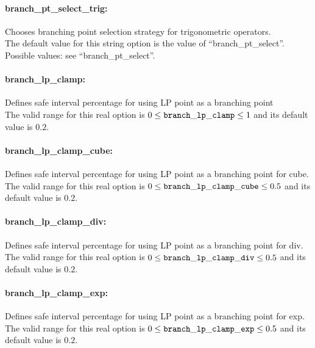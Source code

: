 \paragraph{branch\_pt\_select\_trig:}\label{sec:branch_pt_select_trig} Chooses branching point selection strategy for trigonometric operators. $\;$ \\
The default value for this string option is the value of ``branch\_pt\_select''. \\
Possible values: see ``branch\_pt\_select''.

\paragraph{branch\_lp\_clamp:}\label{sec:branch_lp_clamp} Defines safe interval percentage for using LP point as a branching point $\;$ \\
The valid range for this real option is 
$0 \le {\tt branch\_lp\_clamp } \le 1$
and its default value is $0.2$.

\paragraph{branch\_lp\_clamp\_cube:}\label{sec:branch_lp_clamp_cube} Defines safe interval percentage for using LP point as a branching point for cube. $\;$ \\
The valid range for this real option is 
$0 \le {\tt branch\_lp\_clamp\_cube } \le 0.5$
and its default value is $0.2$.

\paragraph{branch\_lp\_clamp\_div:}\label{sec:branch_lp_clamp_div} Defines safe interval percentage for using LP point as a branching point for div.$\;$ \\
The valid range for this real option is 
$0 \le {\tt branch\_lp\_clamp\_div } \le 0.5$
and its default value is $0.2$.

\paragraph{branch\_lp\_clamp\_exp:}\label{sec:branch_lp_clamp_exp} Defines safe interval percentage for using LP point as a branching point for exp.$\;$ \\
The valid range for this real option is 
$0 \le {\tt branch\_lp\_clamp\_exp } \le 0.5$
and its default value is $0.2$.


